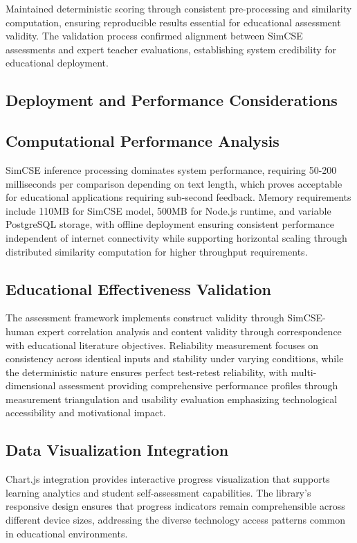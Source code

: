 {{Maintained deterministic scoring through consistent pre-processing and similarity computation, ensuring reproducible results essential for educational assessment validity. The validation process confirmed alignment between SimCSE assessments and expert teacher evaluations, establishing system credibility for educational deployment.

\subsection{Deployment and Performance Considerations}

\subsection{Computational Performance Analysis}

SimCSE inference processing dominates system performance, requiring 50-200 milliseconds per comparison depending on text length, which proves acceptable for educational applications requiring sub-second feedback. Memory requirements include 110MB for SimCSE model, 500MB for Node.js runtime, and variable PostgreSQL storage, with offline deployment ensuring consistent performance independent of internet connectivity while supporting horizontal scaling through distributed similarity computation for higher throughput requirements.

\subsection{Educational Effectiveness Validation}

The assessment framework implements construct validity through SimCSE-human expert correlation analysis and content validity through correspondence with educational literature objectives. Reliability measurement focuses on consistency across identical inputs and stability under varying conditions, while the deterministic nature ensures perfect test-retest reliability, with multi-dimensional assessment providing comprehensive performance profiles through measurement triangulation and usability evaluation emphasizing technological accessibility and motivational impact.
}

\subsection{Data Visualization Integration}

Chart.js integration provides interactive progress visualization that supports learning analytics and student self-assessment capabilities. The library's responsive design ensures that progress indicators remain comprehensible across different device sizes, addressing the diverse technology access patterns common in educational environments.

}
